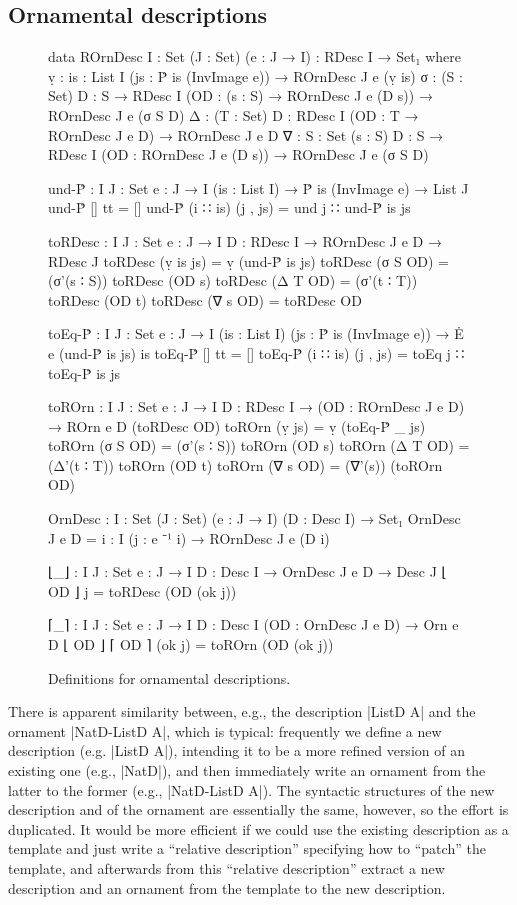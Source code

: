 \subsection{Ornamental descriptions}
\label{sec:ornamental-descriptions}

\begin{figure}
\setlength{\mathindent}{0em}
\begin{code}
data ROrnDesc {I : Set} (J : Set) (e : J → I) : RDesc I → Set₁ where
  ṿ   :  {is : List I} (js : Ṗ is (InvImage e)) → ROrnDesc J e (ṿ is)
  σ   :  (S : Set) {D : S → RDesc I}
         (OD : (s : S) → ROrnDesc J e (D s)) → ROrnDesc J e (σ S D)
  Δ   :  (T : Set) {D : RDesc I} (OD : T → ROrnDesc J e D) → ROrnDesc J e D
  ∇   :  {S : Set} (s : S) {D : S → RDesc I}
         (OD : ROrnDesc J e (D s)) → ROrnDesc J e (σ S D)

und-Ṗ : {I J : Set} {e : J → I} (is : List I) → Ṗ is (InvImage e) → List J
und-Ṗ []        tt        = []
und-Ṗ (i ∷ is)  (j , js)  = und j ∷ und-Ṗ is js

toRDesc : {I J : Set} {e : J → I} {D : RDesc I} → ROrnDesc J e D → RDesc J
toRDesc (ṿ {is} js)  = ṿ (und-Ṗ is js)
toRDesc (σ S OD)     = (σ'(s ∶ S)) toRDesc (OD s)
toRDesc (Δ T OD)     = (σ'(t ∶ T)) toRDesc (OD t)
toRDesc (∇ s OD)     = toRDesc OD

toEq-Ṗ :  {I J : Set} {e : J → I}
          (is : List I) (js : Ṗ is (InvImage e)) → Ė e (und-Ṗ is js) is
toEq-Ṗ []        tt        = []
toEq-Ṗ (i ∷ is)  (j , js)  = toEq j ∷ toEq-Ṗ is js

toROrn :  {I J : Set} {e : J → I} {D : RDesc I} →
          (OD : ROrnDesc J e D) → ROrn e D (toRDesc OD)
toROrn (ṿ js)      = ṿ (toEq-Ṗ _ js)
toROrn (σ S OD)    = (σ'(s ∶ S)) toROrn (OD s)
toROrn (Δ T OD)    = (Δ'(t ∶ T)) toROrn (OD t)
toROrn (∇ s OD)    = (∇'(s)) (toROrn OD)

OrnDesc : {I : Set} (J : Set) (e : J → I) (D : Desc I) → Set₁
OrnDesc J e D = {i : I} (j : e ⁻¹ i) → ROrnDesc J e (D i)

⌊_⌋ : {I J : Set} {e : J → I} {D : Desc I} → OrnDesc J e D → Desc J
⌊ OD ⌋ j = toRDesc (OD (ok j))

⌈_⌉ :  {I J : Set} {e : J → I} {D : Desc I}
       (OD : OrnDesc J e D) → Orn e D ⌊ OD ⌋
⌈ OD ⌉ (ok j) = toROrn (OD (ok j))
\end{code}
\caption{Definitions for ornamental descriptions.}
\label{fig:ornamental-descriptions}
\end{figure}

There is apparent similarity between, e.g., the description |ListD A| and the ornament |NatD-ListD A|, which is typical:
frequently we define a new description (e.g. |ListD A|), intending it to be a more refined version of an existing one (e.g., |NatD|), and then immediately write an ornament from the latter to the former (e.g., |NatD-ListD A|).
The syntactic structures of the new description and of the ornament are essentially the same, however, so the effort is duplicated.
It would be more efficient if we could use the existing description as a template and just write a ``relative description'' specifying how to ``patch'' the template, and afterwards from this ``relative description'' extract a new description and an ornament from the template to the new description.

